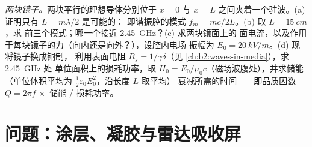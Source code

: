 \begin{exercise}[$\star\star\star$]\label{exo:b2:wave-interfaces:12}
\emph{两块镜子。}两块平行的理想导体分别位于 $x = 0$ 与 $x =
L$ 之间夹着一个驻波。(a) 证明只有 $L = m\lambda/2$ 是可能的：
即谐振腔的模式 $f_m = mc/2L$。(b) 取 $L = \qty{15}{cm}$，求
前三个模式；哪一个接近 \qty{2.45}{GHz}？(c) 求两块镜面上的
面电流，以及作用于每块镜子的力（向内还是向外？），设腔内电场
振幅为 $E_0 = \qty{20}{kV/m}$。(d) 现将镜子换成铜制，
利用表面电阻 $R_s = 1/\gamma\delta$（见
\cref{ch:b2:waves-in-media}），求 \qty{2.45}{GHz} 处
单位面积上的损耗功率，取 $H_0 = E_0/\mu_0c$（磁场波腹处），并求储能
（单位体积平均为 $\tfrac12\varepsilon_0E_0^2$，沿长度 $L$ 取平均）
衰减所需的时间——即品质因数 $Q = 2\pi f\,\times$ 储能 / 损耗功率。
\end{exercise}

\section{问题：涂层、凝胶与雷达吸收屏}

